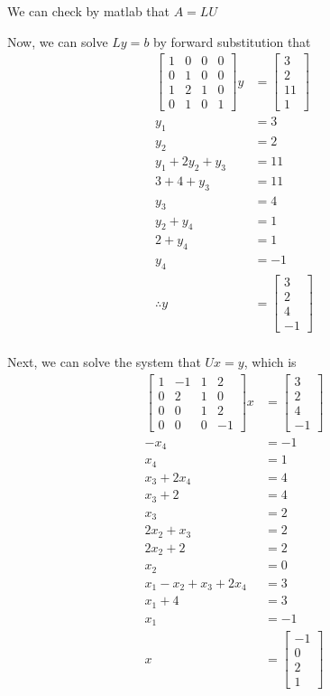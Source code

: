 \documentclass{article}
\begin{document}
\begin{enumerate}
We can check by matlab that $A= LU$


Now, we can solve $Ly = b$ by forward substitution that \begin{align*}
\begin{bmatrix}
1&0&0&0\\0&1&0&0\\1&2&1&0\\0&1&0&1
\end{bmatrix} y &=\begin{bmatrix}
3\\2\\11\\1
\end{bmatrix}\\
y_1&=3\\
y_2&=2\\
y_1+2y_2+y_3&=11\\
3+4+y_3&=11\\
y_3&=4\\
y_2+y_4&=1\\
2+y_4&=1\\
y_4&=-1\\
\therefore y&=\begin{bmatrix}
3\\2\\4\\-1
\end{bmatrix}\\
\end{align*} 

Next, we can solve the system that $Ux = y$, which is \begin{align*}
\begin{bmatrix}
1&-1&1&2\\0&2&1&0\\0&0&1&2\\0&0&0&-1
\end{bmatrix}x &=\begin{bmatrix}
3\\2\\4\\-1
\end{bmatrix}\\
-x_4 &=-1\\x_4&=1\\x_3+2x_4&=4\\x_3+2&=4\\x_3&=2\\2x_2+x_3&=2\\2x_2+2&=2\\x_2&=0\\x_1-x_2+x_3+2x_4&=3\\x_1+4&=3\\x_1&=-1\\x&=\begin{bmatrix}
-1\\0\\2\\1
\end{bmatrix}
\end{align*}


\end{enumerate}
\end{document}
